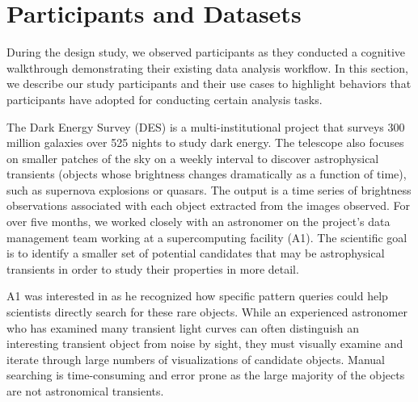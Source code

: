 \section{Participants and Datasets}
During the design study, we observed participants as they conducted a cognitive walkthrough demonstrating their existing data analysis workflow. In this section, we describe our study participants and their use cases to highlight behaviors that participants have adopted for conducting certain analysis tasks.
\par\noindent{} The Dark Energy Survey (DES) is a multi-institutional project that surveys 300 million galaxies over 525 nights to study dark energy\cite{Drlica-Wagner2017}. The telescope also focuses on smaller patches of the sky on a weekly interval to discover astrophysical transients (objects whose brightness changes dramatically as a function of time), such as supernova explosions or quasars. The output is a time series of brightness observations associated with each object extracted from the images observed. For over five months, we worked closely with an astronomer on the project's data management team working at a supercomputing facility (A1). The scientific goal is to identify a smaller set of potential candidates that may be astrophysical transients in order to study their properties in more detail. 
\par A1 was interested in \zv as he recognized how specific pattern queries could help scientists directly search for these rare objects. While an experienced astronomer who has examined many transient light curves can often distinguish an interesting transient object from noise by sight, they must visually examine and iterate through large numbers of visualizations of candidate objects. Manual searching is time-consuming and error prone as the large majority of the objects are not astronomical transients.
